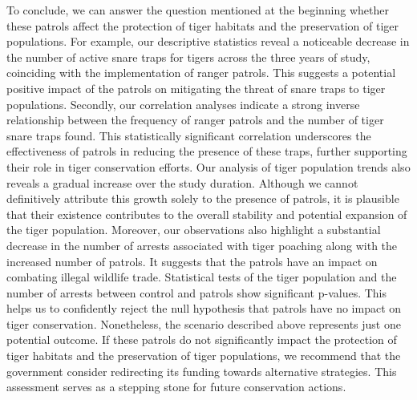 \documentclass[11pt]{article}
\begin{document}
To conclude, we can answer the question mentioned at the beginning whether these patrols affect the protection of tiger habitats and the preservation of tiger populations. For example, our descriptive statistics reveal a noticeable decrease in the number of active snare traps for tigers across the three years of study, coinciding with the implementation of ranger patrols. This suggests a potential positive impact of the patrols on mitigating the threat of snare traps to tiger populations. Secondly, our correlation analyses indicate a strong inverse relationship between the frequency of ranger patrols and the number of tiger snare traps found. This statistically significant correlation underscores the effectiveness of patrols in reducing the presence of these traps, further supporting their role in tiger conservation efforts.  Our analysis of tiger population trends also reveals a gradual increase over the study duration. Although we cannot definitively attribute this growth solely to the presence of patrols, it is plausible that their existence contributes to the overall stability and potential expansion of the tiger population. Moreover, our observations also highlight a substantial decrease in the number of arrests associated with tiger poaching along with the increased number of patrols. It suggests that the patrols have an impact on combating illegal wildlife trade. Statistical tests of the tiger population and the number of arrests between control and patrols show significant p-values. This helps us to confidently reject the null hypothesis that patrols have no impact on tiger conservation. Nonetheless, the scenario described above represents just one potential outcome. If these patrols do not significantly impact the protection of tiger habitats and the preservation of tiger populations, we recommend that the government consider redirecting its funding towards alternative strategies. This assessment serves as a stepping stone for future conservation actions.




\end{document}
